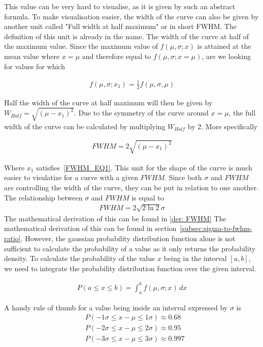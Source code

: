 \documentclass[reprint,english,notitlepage]{revtex4-2}
\begin{document}
This value can be very hard to visualise, as it is given by such an abstract formula.
To make visualisation easier, the width of the curve can also be given by another unit called "Full width at half maximum" or in short FWHM.
The definition of this unit is already in the name. The width of the curve at half of the maximum value.
Since the maximum value of $f(\mu, \sigma; x)$ is attained at the mean value where $x=\mu$ and therefore equal to $f(\mu, \sigma; x=\mu)$, are we looking for values for which

\begin{align}
    f(\mu, \sigma; x_1) = \frac{1}{2} f(\mu, \sigma, \mu) \label{FWHM_EQ1}
\end{align}

Half the width of the curve at half maximum will then be given by $W_{Half} = \sqrt{(\mu - x_1)^2}$.
Due to the symmetry of the curve around $x =\mu$, the full width of the curve can be calculated by multiplying $W_{Half}$ by $2$.
More specifically

\begin{align*}
    FWHM = 2\sqrt{(\mu - x_1)^2}
\end{align*}

Where $x_1$ satisfies~\ref{FWHM_EQ1}. This unit for the shape of the curve is much easier to visulatize for a curve with a given $FWHM$.
Since both $\sigma$ and $FWHM$ are controlling the width of the curve, they can be put in relation to one another.
The relationship between $\sigma$ and $FWHM$ is equal to
\begin{align*}
    FWHM = 2\sqrt{2\ln2}\sigma
\end{align*}
The mathematical derivation of this can be found in
\ref{der: FWHM}
The mathematical derivation of this can be found in section~\ref{subsec:sigma-to-fwhm-ratio}.
However, the gaussian probability distribution function alone is not sufficient to calculate the probability of a value as it only returns the probability density.
To calculate the probability of the value $x$ being in the interval $[a, b]$, we need to integrate the probability distribution function over the given interval.

\begin{align*}
    P(a ≤ x ≤ b) = \int_{a}^{b} f(\mu, \sigma; x) \, dx
\end{align*}

A handy rule of thumb for a value being inside an interval expressed by $\sigma$ is
\begin{align*}
    &P(-1\sigma ≤ x-\mu ≤ 1\sigma) ≈ 0.68\\
	&P(-2\sigma ≤ x-\mu ≤ 2\sigma) ≈ 0.95\\
	&P(-3\sigma ≤ x-\mu ≤ 3\sigma) ≈ 0.997
\end{align*}
\end{document}
